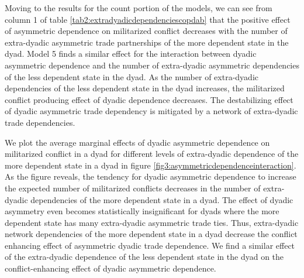 \documentclass[12pt]{article}
\theoremstyle{hypothesis}
\begin{document}
Moving to the results for the count portion of the models, we can see from column 1 of table \ref{tab2:extradyadicdependenciescopdab} that the positive effect of asymmetric dependence on militarized conflict decreases with the number of extra-dyadic asymmetric trade partnerships of the more dependent state in the dyad. Model 5 finds a similar effect for the interaction between dyadic asymmetric dependence and the number of extra-dyadic asymmetric dependencies of the less dependent state in the dyad. As the number of extra-dyadic dependencies of the less dependent state in the dyad increases, the militarized conflict producing effect of dyadic dependence decreases. The destabilizing effect of dyadic asymmetric trade dependency is mitigated by a network of extra-dyadic trade dependencies.

We plot the average marginal effects of dyadic asymmetric dependence on militarized conflict in a dyad for different levels of extra-dyadic dependence of the more dependent state in a dyad in figure \ref{fig3:asymmetricdependenceinteraction}. As the figure reveals, the tendency for dyadic asymmetric dependence to increase the expected number of militarized conflicts decreases in the number of extra-dyadic  dependencies of the more dependent state in a dyad. The effect of dyadic asymmetry even becomes statistically insignificant for dyads where the more dependent state has many extra-dyadic asymmetric trade ties. Thus, extra-dyadic network dependencies of the more dependent state in a dyad decrease the conflict enhancing effect of asymmetric dyadic trade dependence. We find a similar effect of the extra-dyadic dependence of the less dependent state in the dyad on the conflict-enhancing effect of dyadic asymmetric dependence.
\end{document}
